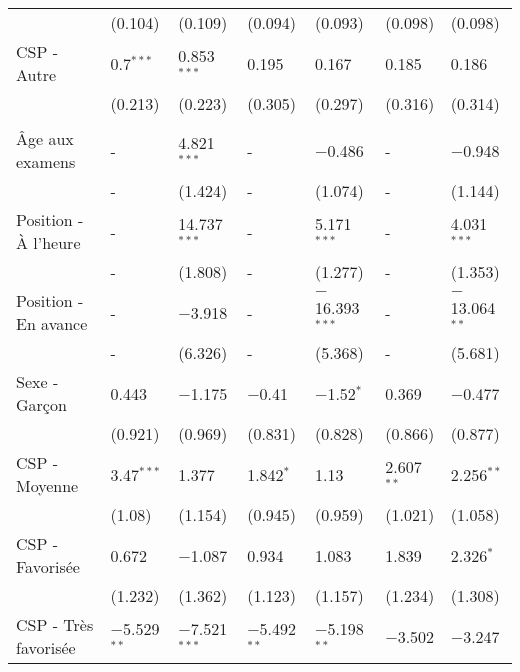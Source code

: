 \documentclass[
]{book}
\begin{document}
\begin{ThreePartTable}
\begin{longtable}[t]{lllllll}
\hspace{1em} & (0.104) & (0.109) & (0.094) & (0.093) & (0.098) & (0.098)\\
\hspace{1em}CSP - Autre & 0.7$^{***}$ & 0.853$^{***}$ & 0.195 & 0.167 & 0.185 & 0.186\\
\hspace{1em} & (0.213) & (0.223) & (0.305) & (0.297) & (0.316) & (0.314)\\
\addlinespace[0.3em]
\multicolumn{7}{l}{\textbf{Moyenne chez les pairs}}\\
\hspace{1em}Âge aux examens & - & 4.821$^{***}$ & - & $-$0.486 & - & $-$0.948\\
\hspace{1em} & - & (1.424) & - & (1.074) & - & (1.144)\\
\hspace{1em}Position - À l'heure & - & 14.737$^{***}$ & - & 5.171$^{***}$ & - & 4.031$^{***}$\\
\hspace{1em} & - & (1.808) & - & (1.277) & - & (1.353)\\
\hspace{1em}Position - En avance & - & $-$3.918 & - & $-$16.393$^{***}$ & - & $-$13.064$^{**}$\\
\hspace{1em} & - & (6.326) & - & (5.368) & - & (5.681)\\
\hspace{1em}Sexe - Garçon & 0.443 & $-$1.175 & $-$0.41 & $-$1.52$^{*}$ & 0.369 & $-$0.477\\
\hspace{1em} & (0.921) & (0.969) & (0.831) & (0.828) & (0.866) & (0.877)\\
\hspace{1em}CSP - Moyenne & 3.47$^{***}$ & 1.377 & 1.842$^{*}$ & 1.13 & 2.607$^{**}$ & 2.256$^{**}$\\
\hspace{1em} & (1.08) & (1.154) & (0.945) & (0.959) & (1.021) & (1.058)\\
\hspace{1em}CSP - Favorisée & 0.672 & $-$1.087 & 0.934 & 1.083 & 1.839 & 2.326$^{*}$\\
\hspace{1em} & (1.232) & (1.362) & (1.123) & (1.157) & (1.234) & (1.308)\\
\hspace{1em}CSP - Très favorisée & $-$5.529$^{**}$ & $-$7.521$^{***}$ & $-$5.492$^{**}$ & $-$5.198$^{**}$ & $-$3.502 & $-$3.247\\

\end{longtable}
\end{ThreePartTable}
\end{document}
